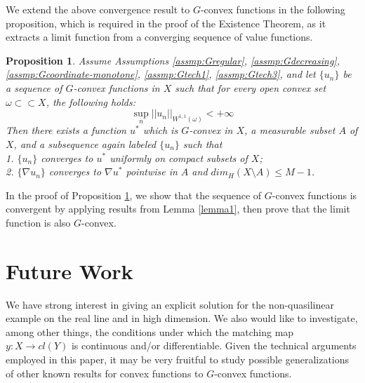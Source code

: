 \documentclass[a4paper, 11pt]{amsart}
\numberwithin{equation}{section}
\theoremstyle{plain}
\newtheorem{proposition}[theorem]{Proposition}
\theoremstyle{definition}
\theoremstyle{remark}
\begin{document}
{We extend the above convergence result to $G$-convex functions in the following proposition, which is required in the proof of the Existence Theorem, as it extracts a limit function from a converging sequence of value functions.}

\begin{proposition}\label{proposition:convergence}
	Assume Assumptions \ref{assmp:Gregular}, \ref{assmp:Gdecreasing}, \ref{assmp:Gcoordinate-monotone}, \ref{assmp:Gtech1}, \ref{assmp:Gtech3}, and let $\{u_n\}$ be a sequence of $G$-convex functions in $X$ such that for every open convex set $\omega \subset \subset X$, the following holds:
	\begin{equation*}
	\sup\limits_{n} ||u_n||_{W^{1,1}(\omega )} < +\infty
	\end{equation*}
	Then there exists a function $u^*$ which is  $G$-convex in $X$, a measurable subset $A$ of $X$, and a subsequence again labeled $\{u_n\}$ such that\\
	1. $\{u_n\}$ converges to $u^*$ uniformly on compact subsets of $X$;\\
	2. $\{\nabla u_n\}$ converges to $\nabla u^*$ pointwise in $A$ and $dim_{H}(X\setminus A)\le M-1$.
\end{proposition}

In the proof of Proposition \ref{proposition:convergence}, we show that the sequence of $G$-convex functions is convergent by applying results from Lemma \ref{lemma1}, then prove that the limit function is also $G$-convex. \medskip



\bigskip





\section{Future Work}\label{section:futurework}

We have strong interest in giving an explicit solution for the non-quasilinear example on the real line and in high dimension. We also would like to investigate, among other things, the conditions under which the matching map $y: X \longrightarrow cl(Y)$ is continuous and/or differentiable. Given the technical arguments employed in this paper, it may be very fruitful to study possible generalizations of other known results for convex functions to $G$-convex functions.




\bigskip
\end{document}
